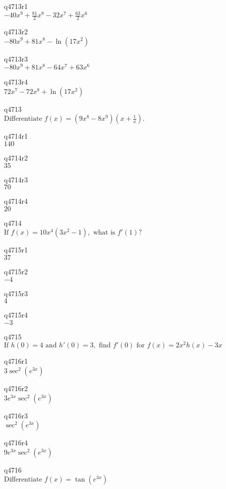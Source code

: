 q4713r1\\
\(\displaystyle -40x^9 + \frac{81}{2} x^8 - 32x^7 + \frac{63}{2} x^6 \)

q4713r2\\
\(\displaystyle -80x^9 + 81x^8 - \ln (17x^2) \)

q4713r3\\
\(\displaystyle -80x^9 + 81x^8 - 64x^7 + 63x^6 \)

q4713r4\\
\(\displaystyle 72x^7 - 72x^8 + \ln(17x^2) \)

q4713\\
\(\displaystyle \text{Differentiate } f(x) = (9x^8 - 8x^9) \left ( x + \frac{1}{x} \right ). \)

q4714r1\\
\(\displaystyle 140 \)

q4714r2\\
\(\displaystyle 35 \)

q4714r3\\
\(\displaystyle 70 \)

q4714r4\\
\(\displaystyle 20 \)

q4714\\
\(\displaystyle \text{If } f(x) = 10x^4(3x^2 - 1), \text{ what is } f'(1)? \)

q4715r1\\
\(\displaystyle 37 \)

q4715r2\\
\(\displaystyle -4 \)

q4715r3\\
\(\displaystyle 4 \)

q4715r4\\
\(\displaystyle -3 \)

q4715\\
\(\displaystyle \text{If } h(0) = 4 \text{ and } h'(0) = 3, \text{ find } f'(0) \text{ for } f(x) = 2x^2 h(x) - 3x \)

q4716r1\\
\(\displaystyle 3\sec^2(e^{3x}) \)

q4716r2\\
\(\displaystyle 3e^{3x} \sec^2 (e^{3x}) \)

q4716r3\\
\(\displaystyle \sec^2 (e^{3x}) \)

q4716r4\\
\(\displaystyle 9e^{3x} \sec^2(e^{3x}) \)

q4716\\
\(\displaystyle \text{Differentiate } f(x) = \tan(e^{3x}) \)

